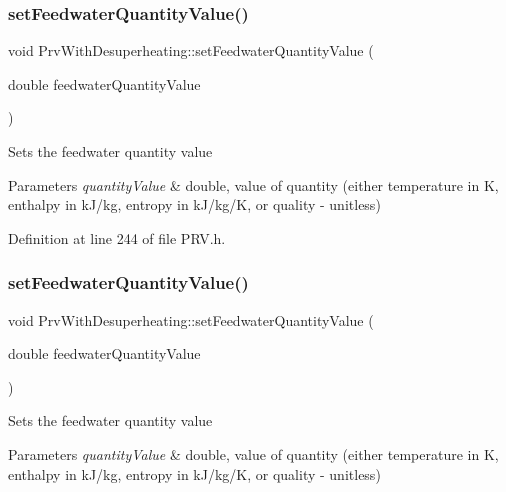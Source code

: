 \subsubsection{\texorpdfstring{set\+Feedwater\+Quantity\+Value()}{setFeedwaterQuantityValue()}\hspace{0.1cm}{\footnotesize\ttfamily [2/3]}}
{\footnotesize\ttfamily void Prv\+With\+Desuperheating\+::set\+Feedwater\+Quantity\+Value (\begin{DoxyParamCaption}\item[{double}]{feedwater\+Quantity\+Value }\end{DoxyParamCaption})\hspace{0.3cm}{\ttfamily [inline]}}

Sets the feedwater quantity value


\begin{DoxyParams}{Parameters}
{\em quantity\+Value} & double, value of quantity (either temperature in K, enthalpy in k\+J/kg, entropy in k\+J/kg/K, or quality -\/ unitless) \\
\hline
\end{DoxyParams}


Definition at line 244 of file P\+R\+V.\+h.

\mbox{\label{class_prv_with_desuperheating_afc17940f7d61898eda1bb4a6f1fea8c3}} 
\subsubsection{\texorpdfstring{set\+Feedwater\+Quantity\+Value()}{setFeedwaterQuantityValue()}\hspace{0.1cm}{\footnotesize\ttfamily [3/3]}}
{\footnotesize\ttfamily void Prv\+With\+Desuperheating\+::set\+Feedwater\+Quantity\+Value (\begin{DoxyParamCaption}\item[{double}]{feedwater\+Quantity\+Value }\end{DoxyParamCaption})\hspace{0.3cm}{\ttfamily [inline]}}

Sets the feedwater quantity value


\begin{DoxyParams}{Parameters}
{\em quantity\+Value} & double, value of quantity (either temperature in K, enthalpy in k\+J/kg, entropy in k\+J/kg/K, or quality -\/ unitless) \\
\hline
\end{DoxyParams}


